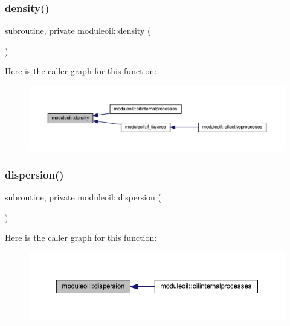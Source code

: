 \subsubsection{\texorpdfstring{density()}{density()}}
{\footnotesize\ttfamily subroutine, private moduleoil\+::density (\begin{DoxyParamCaption}{ }\end{DoxyParamCaption})\hspace{0.3cm}{\ttfamily [private]}}

Here is the caller graph for this function\+:\nopagebreak
\begin{figure}[H]
\begin{center}
\leavevmode
\includegraphics[width=350pt]{namespacemoduleoil_a9b26683d1a6211ffa180e7c4004596be_icgraph}
\end{center}
\end{figure}
\mbox{\label{namespacemoduleoil_af31781708e110ef05e0de36924287137}} 
\subsubsection{\texorpdfstring{dispersion()}{dispersion()}}
{\footnotesize\ttfamily subroutine, private moduleoil\+::dispersion (\begin{DoxyParamCaption}{ }\end{DoxyParamCaption})\hspace{0.3cm}{\ttfamily [private]}}

Here is the caller graph for this function\+:\nopagebreak
\begin{figure}[H]
\begin{center}
\leavevmode
\includegraphics[width=350pt]{namespacemoduleoil_af31781708e110ef05e0de36924287137_icgraph}
\end{center}
\end{figure}
\mbox{\label{namespacemoduleoil_a1eb8385a1fb72338d92a438deda6ddb1}} 
